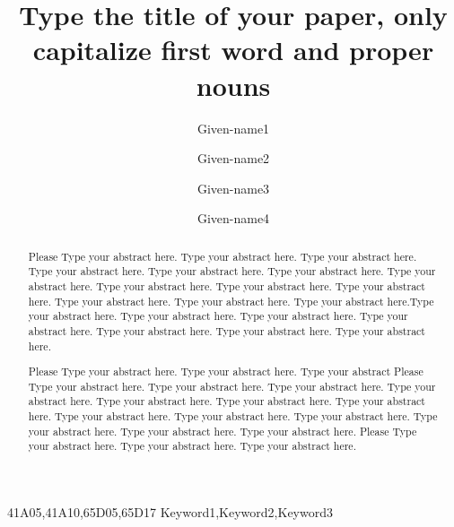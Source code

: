 \documentclass[times,onecolumn,final,longtitle]{elsarticle}
\begin{document}

\begin{frontmatter}

\title{Type the title of your paper, only capitalize first
word and proper nouns}%

\author[1]{Given-name1 }
\author[1]{Given-name2 }
\author[2]{Given-name3 }
\author[2]{Given-name4 }

\address[1]{Affiliation 1, Address, City and Postal Code, Country}
\address[2]{Affiliation 2, Address, City and Postal Code, Country}



\begin{abstract}
Please Type your abstract here. Type your abstract here. Type your abstract
here. Type your abstract here. Type your abstract here. Type your
abstract here. Type your abstract here. Type your abstract here. Type
your abstract here. Type your abstract here. Type your abstract here.
Type your abstract here. Type your abstract here.Type your abstract here.
Type your abstract here. Type your abstract here. Type your abstract here.
Type your abstract here. Type your abstract here. Type your abstract here.

Please Type your abstract here. Type your abstract here. Type your abstract
Please Type your abstract here. Type your abstract here. Type your abstract
here. Type your abstract here. Type your abstract here. Type your
abstract here. Type your abstract here. Type your abstract here. Type
your abstract here. Type your abstract here. Type your abstract here.
Type your abstract here. Type your abstract here.
Please Type your abstract here. Type your abstract here.
Type your abstract here.
\end{abstract}

\begin{keyword}
\MSC 41A05\sep 41A10\sep 65D05\sep 65D17
\KWD Keyword1\sep Keyword2\sep Keyword3
\end{keyword}

\end{frontmatter}
\end{document}

